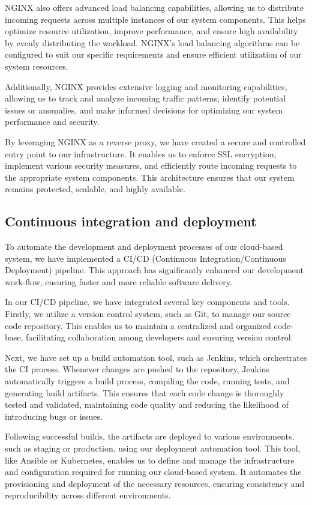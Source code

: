 \documentclass[
12pt,
oneside, 
onehalfspacing, 
nolistspacing, 
parskip, 
chapterinoneline, 
]{AASTCOMPUTER}
\begin{document}
NGINX also offers advanced load balancing capabilities, allowing us to distribute incoming requests across multiple instances of our system components. This helps optimize resource utilization, improve performance, and ensure high availability by evenly distributing the workload. NGINX's load balancing algorithms can be configured to suit our specific requirements and ensure efficient utilization of our system resources.

Additionally, NGINX provides extensive logging and monitoring capabilities, allowing us to track and analyze incoming traffic patterns, identify potential issues or anomalies, and make informed decisions for optimizing our system performance and security.

By leveraging NGINX as a reverse proxy, we have created a secure and controlled entry point to our infrastructure. It enables us to enforce SSL encryption, implement various security measures, and efficiently route incoming requests to the appropriate system components. This architecture ensures that our system remains protected, scalable, and highly available.

\subsection{Continuous integration and deployment}
To automate the development and deployment processes of our cloud-based system, we have implemented a CI/CD (Continuous Integration/Continuous Deployment) pipeline. This approach has significantly enhanced our development work-flow, ensuring faster and more reliable software delivery.

In our CI/CD pipeline, we have integrated several key components and tools. Firstly, we utilize a version control system, such as Git, to manage our source code repository. This enables us to maintain a centralized and organized code-base, facilitating collaboration among developers and ensuring version control.

Next, we have set up a build automation tool, such as Jenkins, which orchestrates the CI process. Whenever changes are pushed to the repository, Jenkins automatically triggers a build process, compiling the code, running tests, and generating build artifacts. This ensures that each code change is thoroughly tested and validated, maintaining code quality and reducing the likelihood of introducing bugs or issues.

Following successful builds, the artifacts are deployed to various environments, such as staging or production, using our deployment automation tool. This tool, like Ansible or Kubernetes, enables us to define and manage the infrastructure and configuration required for running our cloud-based system. It automates the provisioning and deployment of the necessary resources, ensuring consistency and reproducibility across different environments.
\end{document}
